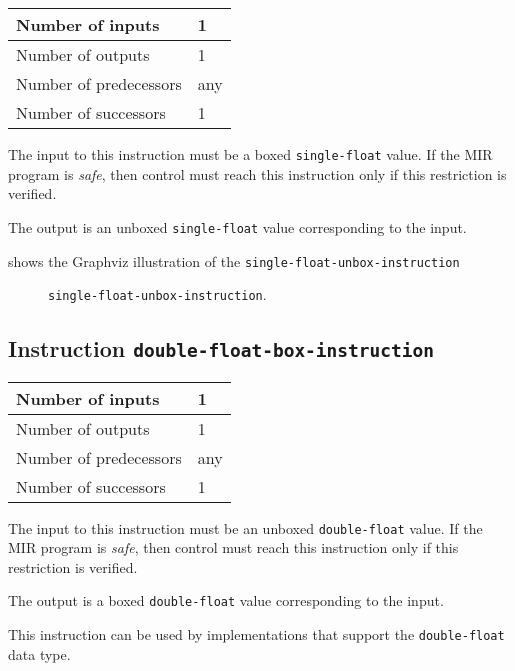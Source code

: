 \begin{tabular}{|l|l|}
\hline
Number of inputs & 1\\
\hline
Number of outputs & 1\\
\hline
Number of predecessors & any\\
\hline
Number of successors & 1\\
\hline
\end{tabular}

The input to this instruction must be a boxed \texttt{single-float}
value.  If the MIR program is \emph{safe}, then control must reach
this instruction only if this restriction is verified.

The output is an unboxed \texttt{single-float} value corresponding to
the input.

 shows the Graphviz illustration of the
\texttt{single-float-unbox-instruction}

\begin{figure}
\begin{center}
\end{center}
\caption{\label{fig-single-float-unbox-instruction}
\texttt{single-float-unbox-instruction}.}
\end{figure}

\subsection{Instruction \texttt{double-float-box-instruction}}
\label{mir-instruction-double-float-box}

\begin{tabular}{|l|l|}
\hline
Number of inputs & 1\\
\hline
Number of outputs & 1\\
\hline
Number of predecessors & any\\
\hline
Number of successors & 1\\
\hline
\end{tabular}

The input to this instruction must be an unboxed \texttt{double-float}
value.  If the MIR program is \emph{safe}, then control must reach
this instruction only if this restriction is verified.

The output is a boxed \texttt{double-float} value corresponding to the
input.

This instruction can be used by implementations that support the
\texttt{double-float} data type.   

